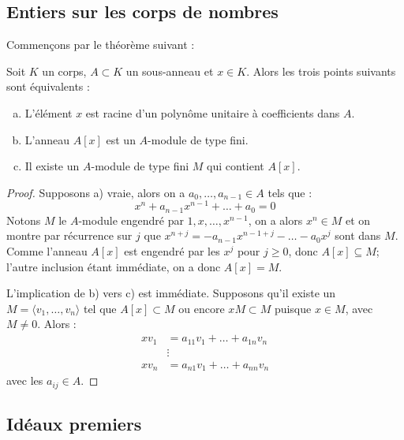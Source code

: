 \documentclass[a4paper]{article} %
\numberwithin{section}{part}
\numberwithin{equation}{section}
\begin{document}
\subsection{Entiers sur les corps de nombres}
Commençons par le théorème suivant :
\begin{thm}
Soit $K$ un corps, $A\subset K$ un sous-anneau et $x\in K$. Alors les trois
points suivants sont équivalents :
\begin{enumerate}[a)]
\item L'élément $x$ est racine d'un polynôme unitaire à coefficients dans $A$.

\item L'anneau $A[x]$ est un $A$-module de type fini.

\item Il existe un $A$-module de type fini $M$ qui contient $A[x]$.

\end{enumerate}
\end{thm}
\begin{proof}
Supposons a) vraie, alors on a $a_0,\dots,a_{n-1}\in A$ tels que :
\[x^n + a_{n-1}x^{n-1} + \dots + a_0 = 0\]
Notons $M$ le $A$-module engendré par $1, x,\dots, x^{n-1}$, on a alors $x^n\in
M$ et on montre par récurrence sur $j$ que $x^{n+j} = -a_{n-1}x^{n-1 +
j}-\dots- a_0x^j$ sont dans $M$. Comme l'anneau $A[x]$ est engendré par les
$x^j$ pour $j\geq0$, donc $A[x] \subseteq M$; l'autre inclusion étant immédiate,
on a donc $A[x] = M$.\par
L'implication de b) vers c) est immédiate. Supposons qu'il existe un $M =
\langle{v_1,\dots,v_n}\rangle$ tel que $A[x]\subset M$ ou encore $xM \subset M$
puisque $x\in M$, avec $M\neq 0$. Alors :
\begin{align*}
xv_1 &= a_{11}v_1 + \dots + a_{1n}v_n\\
&\vdots\\
xv_n &= a_{n1}v_1 + \dots + a_{nn}v_n
\end{align*}
avec les $a_{ij}\in A$. 
\end{proof}



\subsection{Idéaux premiers}
\end{document}
